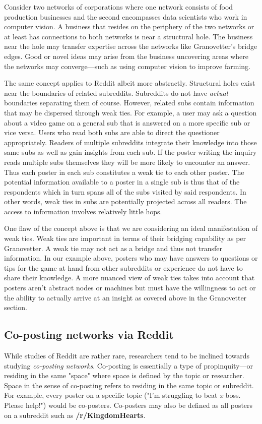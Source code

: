 \documentclass[12pt, a4paper]{article}
\begin{document}
Consider two networks of corporations where one network consists of food production businesses and the second encompasses data scientists who work in computer vision. A business that resides on the periphery of the two networks or at least has connections to both networks is near a structural hole. The business near the hole may transfer expertise across the networks like Granovetter's bridge edges. Good or novel ideas may arise from the business uncovering areas where the networks may converge---such as using computer vision to improve farming.

The same concept applies to Reddit albeit more abstractly. Structural holes exist near the boundaries of related subreddits. Subreddits do not have \textit{actual} boundaries separating them of course. However, related subs contain information that may be dispersed through weak ties. For example, a user may ask a question about a video game on a general sub that is answered on a more specific sub or vice versa. Users who read both subs are able to direct the questioner appropriately. Readers of multiple subreddits integrate their knowledge into those same subs as well as gain insights from each sub. If the poster writing the inquiry reads multiple subs themselves they will be more likely to encounter an answer. Thus each poster in each sub constitutes a weak tie to each other poster. The potential information available to a poster in a single sub is thus that of the respondents which in turn spans all of the subs visited by said respondents. In other words, weak ties in subs are potentially projected across all readers. The access to information involves relatively little hops.

One flaw of the concept above is that we are considering an ideal manifestation of weak ties. Weak ties are important in terms of their bridging capability as per Granovetter. A weak tie may not act as a bridge and thus not transfer information. In our example above, posters who may have answers to questions or tips for the game at hand from other subreddits or experience do not have to share their knowledge. A more nuanced view of weak ties takes into account that posters aren't abstract nodes or machines but must have the willingness to act or the ability to actually arrive at an insight as covered above in the Granovetter section.

\subsection{Co-posting networks via Reddit}
While studies of Reddit are rather rare, researchers tend to be inclined towards studying \textit{co-posting networks}. Co-posting is essentially a type of propinquity---or residing in the same "space" where space is defined by the topic or researcher. Space in the sense of co-posting refers to residing in the same topic or subreddit. For example, every poster on a specific topic ("I'm struggling to beat \textit{x} boss. Please help!") would be co-posters. Co-posters may also be defined as all posters on a subreddit such as \textbf{/r/KingdomHearts}.
\end{document}
